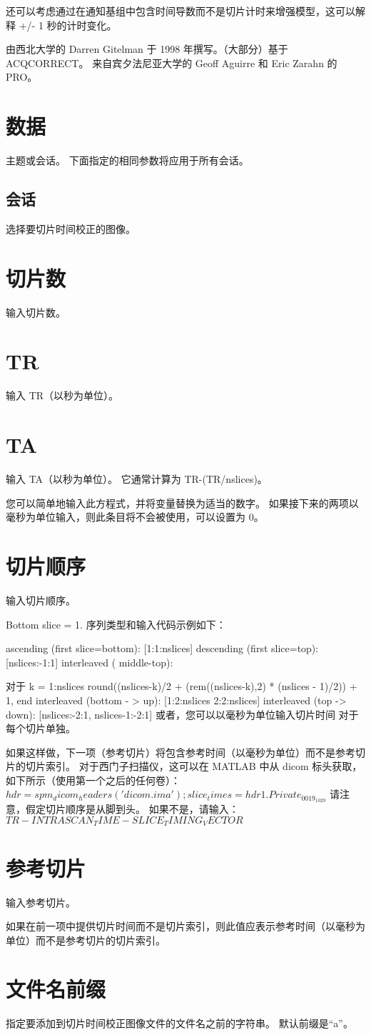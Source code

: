 还可以考虑通过在通知基组中包含时间导数而不是切片计时来增强模型，这可以解释 +/- 1 秒的计时变化。


由西北大学的 Darren Gitelman 于 1998 年撰写。（大部分）基于 ACQCORRECT。
来自宾夕法尼亚大学的 Geoff Aguirre 和 Eric Zarahn 的 PRO。


\section{数据}
主题或会话。
下面指定的相同参数将应用于所有会话。


\subsection{会话}
选择要切片时间校正的图像。


\section{切片数}
输入切片数。


\section{TR}
输入 TR（以秒为单位）。


\section{TA}

输入 TA（以秒为单位）。
它通常计算为 TR-(TR/nslices)。


您可以简单地输入此方程式，并将变量替换为适当的数字。
如果接下来的两项以毫秒为单位输入，则此条目将不会被使用，可以设置为 0。


\section{切片顺序}
输入切片顺序。

Bottom slice = 1. 序列类型和输入代码示例如下： 

ascending (first slice=bottom): [1:1:nslices] descending (first slice=top): [nslices:-1:1] interleaved ( middle-top): 

对于 k = 1:nslices round((nslices-k)/2 + (rem((nslices-k),2) * (nslices - 1)/2)) + 1, end interleaved (bottom - > up): [1:2:nslices 2:2:nslices] interleaved (top -> down): [nslices:-2:1, nslices-1:-2:1] 或者，您可以以毫秒为单位输入切片时间 对于每个切片单独。


如果这样做，下一项（参考切片）将包含参考时间（以毫秒为单位）而不是参考切片的切片索引。 对于西门子扫描仪，这可以在 MATLAB 中从 dicom 标头获取，如下所示（使用第一个之后的任何卷）： $ hdr = spm_dicom_headers('dicom.ima'); slice_times = hdr1.Private_0019_1029 $ 请注意，假定切片顺序是从脚到头。 
如果不是，请输入：$ TR - INTRASCAN_TIME - SLICE_TIMING_VECTOR $


\section{参考切片}

输入参考切片。

如果在前一项中提供切片时间而不是切片索引，则此值应表示参考时间（以毫秒为单位）而不是参考切片的切片索引。

\section{文件名前缀}

指定要添加到切片时间校正图像文件的文件名之前的字符串。 默认前缀是“a”。
